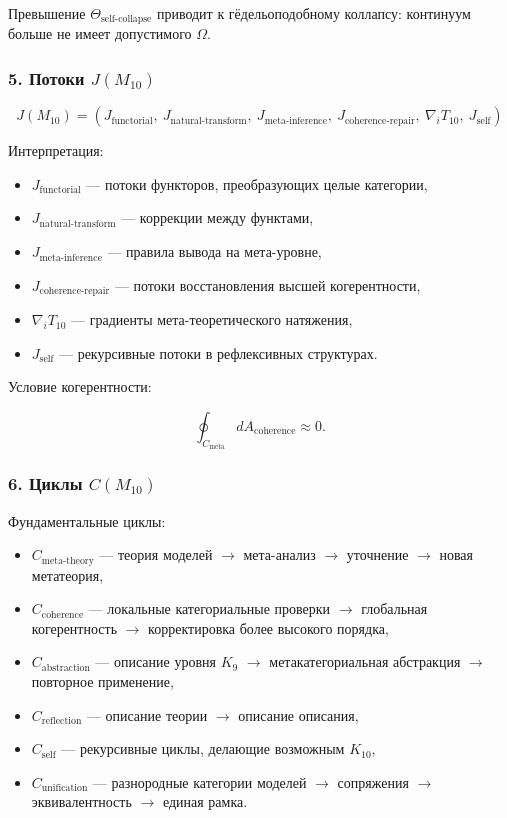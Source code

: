 Превышение $\Theta_{\mathrm{self\mbox{-}collapse}}$ приводит к
гёдельоподобному коллапсу:
континуум больше не имеет допустимого $\Omega$.

\subsubsection*{5. Потоки \texorpdfstring{$J(M_{10})$}{J(M_{10})}}

\[
J(M_{10}) =
(J_{\mathrm{functorial}},\
 J_{\mathrm{natural\mbox{-}transform}},\
 J_{\mathrm{meta\mbox{-}inference}},\
 J_{\mathrm{coherence\mbox{-}repair}},\
 \nabla_i T_{10},\
 J_{\mathrm{self}})
\]

Интерпретация:

\begin{itemize}
    \item $J_{\mathrm{functorial}}$ — потоки функторов, преобразующих целые категории,
    \item $J_{\mathrm{natural\mbox{-}transform}}$ — коррекции между функтами,
    \item $J_{\mathrm{meta\mbox{-}inference}}$ — правила вывода на мета-уровне,
    \item $J_{\mathrm{coherence\mbox{-}repair}}$ — потоки восстановления высшей когерентности,
    \item $\nabla_i T_{10}$ — градиенты мета-теоретического натяжения,
    \item $J_{\mathrm{self}}$ — рекурсивные потоки в рефлексивных структурах.
\end{itemize}

Условие когерентности:

\[
\oint_{C_{\mathrm{meta}}} dA_{\mathrm{coherence}} \approx 0.
\]

\subsubsection*{6. Циклы \texorpdfstring{$C(M_{10})$}{C(M_{10})}}

Фундаментальные циклы:

\begin{itemize}
    \item $C_{\mathrm{meta\mbox{-}theory}}$
        — теория моделей $\to$ мета-анализ $\to$ уточнение $\to$ новая метатеория,
    \item $C_{\mathrm{coherence}}$
        — локальные категориальные проверки $\to$ глобальная когерентность $\to$ корректировка более высокого порядка,
    \item $C_{\mathrm{abstraction}}$
        — описание уровня $K_9$ $\to$ метакатегориальная абстракция $\to$ повторное применение,
    \item $C_{\mathrm{reflection}}$
        — описание теории $\to$ описание описания,
    \item $C_{\mathrm{self}}$
        — рекурсивные циклы, делающие возможным $K_{10}$,
    \item $C_{\mathrm{unification}}$
        — разнородные категории моделей $\to$ сопряжения $\to$ эквивалентность $\to$ единая рамка.
\end{itemize}

